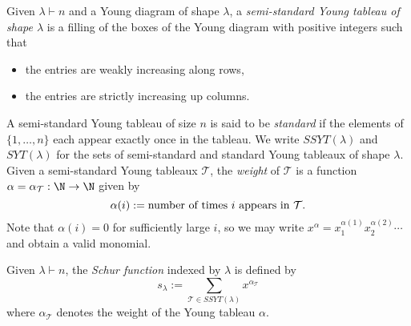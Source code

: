 \documentclass[12pt]{article}
\begin{document}
\begin{definition}\label{def:youngtableaux}
  Given $ \lambda\vdash n $ and a Young diagram of shape $ \lambda $, a \textit{semi-standard Young tableau of shape $ \lambda $} is a filling of the boxes of the Young diagram with positive integers such that 
  \begin{itemize}
    \item the entries are weakly increasing along rows,
    \item the entries are strictly increasing up columns.
  \end{itemize}
  A semi-standard Young tableau of size $ n $ is said to be \textit{standard} if the elements of $ \{1,\ldots,n\} $ each appear exactly once in the tableau. We write $ SSYT(\lambda) $ and $ SYT(\lambda) $ for the sets of semi-standard and standard Young tableaux of shape $ \lambda $. Given a semi-standard Young tableaux $ \mathcal{T} $, the \textit{weight} of $ \mathcal{T} $ is a function $ \alpha=\alpha_{\mathcal{T}}:\N \to \N$ given by
  \[
    \alpha(i) := \text{number of times $ i $ appears in $ \mathcal{T} $}.
  \]
  Note that $ \alpha(i) = 0 $ for sufficiently large $ i $, so we may write $ x^{\alpha} = x_{1}^{\alpha(1)}x_{2}^{\alpha(2)} \cdots $ and obtain a valid monomial.
\end{definition}


\begin{definition}\label{def:schur}
  Given $ \lambda\vdash n $, the \textit{Schur function} indexed by $ \lambda $ is defined by
 \[
  s_{\lambda} := \sum_{\mathcal{T}\in SSYT(\lambda) } x^{\alpha_{\mathcal{T}}}
\] 
where $ \alpha_{\mathcal{T}} $ denotes the weight of the Young tableau $ \alpha $.
\end{definition}
\end{document}

